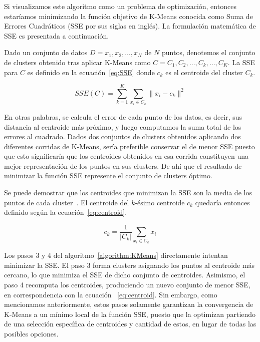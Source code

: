 Si visualizamos este algoritmo como un problema de optimización, entonces estaríamos minimizando la función objetivo de K-Means conocida como Suma de Errores Cuadráticos (SSE por sus siglas en inglés).
La formulación matemática de SSE es presentada a continuación.

Dado un conjunto de datos $D={x_1,x_2,\dots,x_N}$ de $N$ puntos, denotemos el conjunto de clusters obtenido tras aplicar K-Means como $C={C_1,C_2,\dots,C_k,\dots,C_K}$.
La SSE para $C$ es definido en la ecuación~\ref{eq:SSE} donde $c_k$ es el centroide del cluster $C_k$.

\begin{equation}
    \label{eq:SSE}
    SSE(C)=\sum_{k=1}^{K}{\sum_{x_{i}\in C_k}{\|x_i-c_k\|^2}}
\end{equation}

En otras palabras, se calcula el error de cada punto de los datos, es decir, sus distancia al centroide más próximo, y luego computamos la suma total de los errores al cuadrado.
Dados dos conjuntos de clusters obtenidos aplicando dos diferentes corridas de K-Means, sería preferible conservar el de menor SSE puesto que esto significaría que los centroides obtenidos en esa corrida constituyen una mejor representación de los puntos en sus clusters.
De ahí que el resultado de minimizar la función SSE represente el conjunto de clusters óptimo.

Se puede demostrar que los centroides que minimizan la SSE son la media de los puntos de cada cluster~\cite{Tan05}.
El centroide del $k$-ésimo centroide $c_k$ quedaría entonces definido según la ecuación~\ref{eq:centroid}.

\begin{equation}
    \label{eq:centroid}
    c_{k}=\frac{1}{|C_k|}\sum_{x_{i}\in C_k}{x_i}
\end{equation}

Los pasos 3 y 4 del algoritmo~\ref{algorithm:KMeans} directamente intentan minimizar la SSE. El paso 3 forma clusters asignando los puntos al centroide más cercano, lo que minimiza el SSE de dicho conjunto de centroides.
Asimismo, el paso 4 recomputa los centroides, produciendo un nuevo conjunto de menor SSE, en correspondencia con la ecuación ~\ref{eq:centroid}.
Sin embargo, como mencionamos anteriormente, estos pasos solamente garantizan la convergencia de K-Means a un mínimo local de la función SSE, puesto que la optimizan partiendo de una selección específica de centroides y cantidad de estos, en lugar de todas las posibles opciones.

